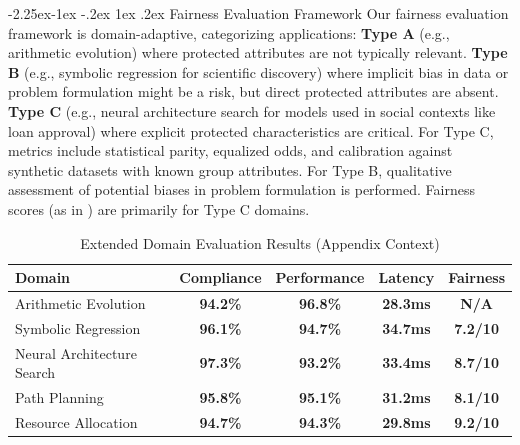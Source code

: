 \documentclass[manuscript,screen,review,anonymous,9pt]{acmart}
\makeatletter
\renewcommand\subsection{\@startsection{subsection}{2}{\z@}%
  {-2.25ex\@plus -1ex \@minus -.2ex}%
  {1ex \@plus .2ex}%
  {\normalfont\large\bfseries}}
\newcommand{\tablesize}{\tiny}
\newcommand{\tablenumfmt}[1]{\textbf{#1}}
\newcommand{\tableheader}[1]{\textbf{#1}}
\makeatother
\begin{document}
\subsection{Fairness Evaluation Framework}
Our fairness evaluation framework is domain-adaptive, categorizing applications: \textbf{Type A} (e.g., arithmetic evolution) where protected attributes are not typically relevant. \textbf{Type B} (e.g., symbolic regression for scientific discovery) where implicit bias in data or problem formulation might be a risk, but direct protected attributes are absent. \textbf{Type C} (e.g., neural architecture search for models used in social contexts like loan approval) where explicit protected characteristics are critical. For Type C, metrics include statistical parity, equalized odds, and calibration against synthetic datasets with known group attributes. For Type B, qualitative assessment of potential biases in problem formulation is performed. Fairness scores (as in ) are primarily for Type C domains.

\begin{table}[htbp]
\centering
\caption{Extended Domain Evaluation Results (Appendix Context)}
\label{tab:appendix_extended_domain_results_fairness} %
\tablesize %
\begin{tabular}{@{}lcccc@{}} %
\toprule
\tableheader{Domain} & \tableheader{Compliance} & \tableheader{Performance} & \tableheader{Latency} & \tableheader{Fairness} \\
\midrule
Arithmetic Evolution & \tablenumfmt{94.2\%} & \tablenumfmt{96.8\%} & \tablenumfmt{28.3ms} & \tablenumfmt{N/A} \\
Symbolic Regression & \tablenumfmt{96.1\%} & \tablenumfmt{94.7\%} & \tablenumfmt{34.7ms} & \tablenumfmt{7.2/10} \\
Neural Architecture Search & \tablenumfmt{97.3\%} & \tablenumfmt{93.2\%} & \tablenumfmt{33.4ms} & \tablenumfmt{8.7/10} \\
Path Planning & \tablenumfmt{95.8\%} & \tablenumfmt{95.1\%} & \tablenumfmt{31.2ms} & \tablenumfmt{8.1/10} \\
Resource Allocation & \tablenumfmt{94.7\%} & \tablenumfmt{94.3\%} & \tablenumfmt{29.8ms} & \tablenumfmt{9.2/10} \\
\bottomrule %
\end{tabular}
\end{table}
\end{document}
